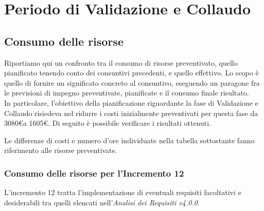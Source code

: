{{{{{{{{{{{{\clearpage

\section{Periodo di Validazione e Collaudo}\label{ConsutivoFaseValidazioneCollaudo}
%
%
%
\subsection{Consumo delle risorse}

Riportiamo qui un confronto tra il consumo di risorse preventivato, quello pianificato tenendo conto dei consuntivi precedenti, e quello effettivo. Lo scopo è quello di fornire un significato concreto al consuntivo, eseguendo un paragone fra le previsioni di impegno preventivate, pianificate e il consumo finale risultato. \\
In particolare, l'obiettivo della pianificazione riguardante la fase di Validazione e Collaudo risiedeva nel ridurre i costi inizialmente preventivati per questa fase da 3080\euro a 1605\euro.
Di seguito è possibile verificare i risultati ottenuti.

Le differenze di costi e numero d'ore individuate nella tabella sottostante fanno riferimento alle risorse preventivate.

\subsubsection{Consumo delle risorse per l'Incremento 12}
L'incremento 12 tratta l'implementazione di eventuali requisiti facoltativi e desiderabili tra quelli elencati nell'\textit{Analisi dei Requisiti v4.0.0}. \\
\quad
\def\tabularxcolumn#1{m{#1}}
{

}}}}}}}}}}}}}

